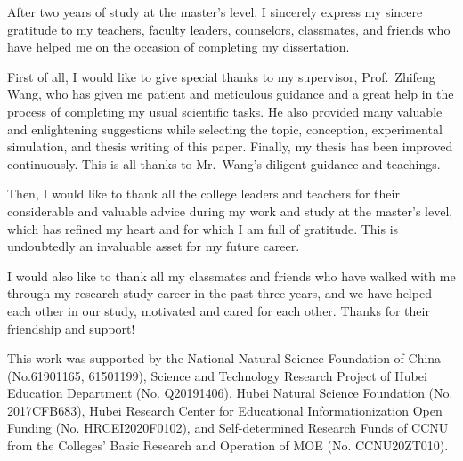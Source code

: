
\begin{acknowledgments}




    After two years of study at the master's level, I sincerely express my sincere gratitude to my teachers, faculty leaders, counselors, classmates, and friends who have helped me on the occasion of completing my dissertation.

    First of all, I would like to give special thanks to my supervisor, Prof.\ Zhifeng Wang, who has given me patient and meticulous guidance and a great help in the process of completing my usual scientific tasks. He also provided many valuable and enlightening suggestions while selecting the topic, conception, experimental simulation, and thesis writing of this paper. Finally, my thesis has been improved continuously. This is all thanks to Mr.\ Wang's diligent guidance and teachings.

    Then, I would like to thank all the college leaders and teachers for their considerable and valuable advice during my work and study at the master's level, which has refined my heart and for which I am full of gratitude. This is undoubtedly an invaluable asset for my future career.

    I would also like to thank all my classmates and friends who have walked with me through my research study career in the past three years, and we have helped each other in our study, motivated and cared for each other. Thanks for their friendship and support!

    This work was supported by the National Natural Science Foundation of China (No.61901165, 61501199), Science and Technology Research Project of Hubei Education Department (No. Q20191406), Hubei Natural Science Foundation (No. 2017CFB683), Hubei Research Center for Educational Informationization Open Funding (No. HRCEI2020F0102), and Self-determined Research Funds of CCNU from the Colleges' Basic Research and Operation of MOE (No. CCNU20ZT010).

\end{acknowledgments}
